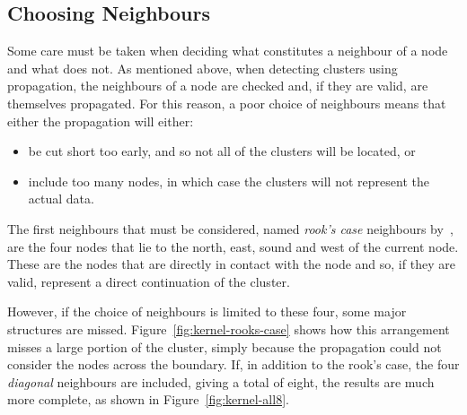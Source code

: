 \subsection{Choosing Neighbours}
\label{sub:choosing_neighbours}

Some care must be taken when deciding what constitutes a neighbour of a node
and what does not. As mentioned above, when detecting clusters using
propagation, the neighbours of a node are checked and, if they are valid, are
themselves propagated. For this reason, a poor choice of neighbours means that
either the propagation will either:

\begin{itemize}
	\item be cut short too early, and so not all of the clusters will be
		located, or
	\item include too many nodes, in which case the clusters will not represent
		the actual data.
\end{itemize}

The first neighbours that must be considered, named \emph{rook's case}
neighbours by~\cite{abel1990comparative}, are the four nodes that lie to the
north, east, sound and west of the current node. These are the nodes that are
directly in contact with the node and so, if they are valid, represent a direct
continuation of the cluster.

However, if the choice of neighbours is limited to these four, some major
structures are missed. Figure~\ref{fig:kernel-rooks-case} shows how this
arrangement misses a large portion of the cluster, simply because the
propagation could not consider the nodes across the boundary. If, in addition
to the rook's case, the four \emph{diagonal} neighbours are included, giving a
total of eight, the results are much more complete, as shown in
Figure~\ref{fig:kernel-all8}.


